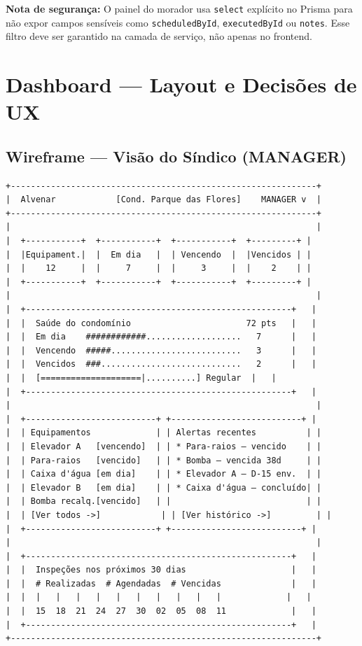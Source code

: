 \documentclass[12pt, a4paper]{article}
\begin{document}
\textbf{Nota de segurança:} O painel do morador usa \texttt{select} explícito no Prisma
para não expor campos sensíveis como \texttt{scheduledById}, \texttt{executedById} ou
\texttt{notes}. Esse filtro deve ser garantido na camada de serviço, não apenas no frontend.

\vspace{0.5cm}

\section{Dashboard — Layout e Decisões de UX}
\label{sec:dashboard}

\subsection{Wireframe — Visão do Síndico (MANAGER)}

\begin{verbatim}
+-------------------------------------------------------------+
|  Alvenar            [Cond. Parque das Flores]    MANAGER v  |
+-------------------------------------------------------------+
|                                                             |
|  +-----------+  +-----------+  +-----------+  +---------+ |
|  |Equipament.|  |  Em dia   |  | Vencendo  |  |Vencidos | |
|  |    12     |  |     7     |  |     3     |  |    2    | |
|  +-----------+  +-----------+  +-----------+  +---------+ |
|                                                             |
|  +-----------------------------------------------------+   |
|  |  Saúde do condomínio                       72 pts   |   |
|  |  Em dia    ############...................   7      |   |
|  |  Vencendo  #####..........................   3      |   |
|  |  Vencidos  ###............................   2      |   |
|  |  [====================|..........] Regular  |   |
|  +-----------------------------------------------------+   |
|                                                             |
|  +--------------------------+ +--------------------------+ |
|  | Equipamentos             | | Alertas recentes          | |
|  | Elevador A   [vencendo]  | | * Para-raios — vencido    | |
|  | Para-raios   [vencido]   | | * Bomba — vencida 38d     | |
|  | Caixa d'água [em dia]    | | * Elevador A — D-15 env.  | |
|  | Elevador B   [em dia]    | | * Caixa d'água — concluído| |
|  | Bomba recalq.[vencido]   | |                           | |
|  | [Ver todos ->]            | | [Ver histórico ->]         | |
|  +--------------------------+ +--------------------------+ |
|                                                             |
|  +-----------------------------------------------------+   |
|  |  Inspeções nos próximos 30 dias                     |   |
|  |  # Realizadas  # Agendadas  # Vencidas              |   |
|  |  |   |   |   |   |   |   |   |   |   |             |   |
|  |  15  18  21  24  27  30  02  05  08  11             |   |
|  +-----------------------------------------------------+   |
+-------------------------------------------------------------+
\end{verbatim}
\end{document}
